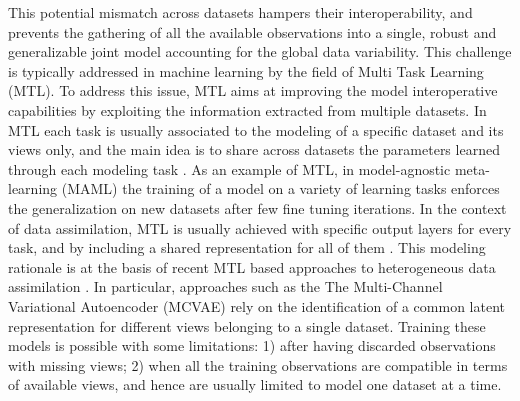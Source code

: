 This potential mismatch across datasets hampers their interoperability,
and prevents the gathering of all the available observations into a single, robust and generalizable joint model accounting for the global data variability.
%
%
This challenge is typically addressed in machine learning by the field of Multi Task Learning (MTL).
To address this issue, MTL aims at improving the model interoperative capabilities by exploiting the information extracted from multiple datasets.
In MTL each task is usually associated to the modeling of a specific dataset and its views only,
and the main idea is to share across datasets the parameters learned through each modeling task \citep{Caruana1998, Dorado-Moreno2020}.
As an example of MTL, in model-agnostic meta-learning (MAML) \citep{MAML1} the training of a model on a variety of learning tasks enforces the generalization on new datasets after few fine tuning iterations.
%
In the context of data assimilation, MTL is usually achieved with specific output layers for every task, and by including a shared representation for all of them \citep{Dorado-Moreno2020}.
This modeling rationale is at the basis of recent MTL based approaches to heterogeneous data assimilation \citep{Wu2018, Antelmi2019, Shi2019}.
In particular, approaches such as the The Multi-Channel Variational Autoencoder (MCVAE) \citep{Antelmi2019} rely on the identification of a common latent representation for different views belonging to a single dataset.
Training these models is possible with some limitations:
1) after having discarded observations with missing views;
2) when all the training observations are compatible in terms of available views, and hence are usually limited to model one dataset at a time.

